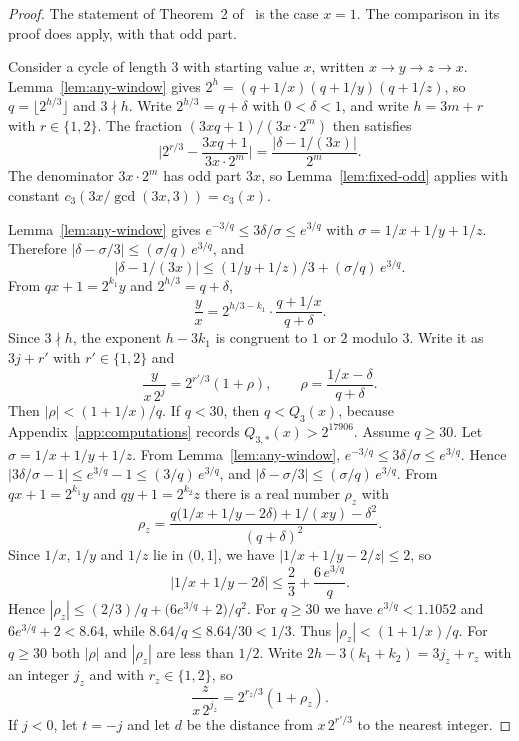 \documentclass[11pt]{article}
\begin{document}
\begin{proof}
The statement of Theorem~2 of~\cite{hackman-i} is the case $x = 1$.
The comparison in its proof does apply, with that odd part.

Consider a cycle of length $3$ with starting value $x$, written $x \to y \to z \to x$.
Lemma~\ref{lem:any-window} gives $2^h = (q+1/x)(q+1/y)(q+1/z)$, so $q = \lfloor 2^{h/3} \rfloor$ and $3 \nmid h$.
Write $2^{h/3} = q + \delta$ with $0 < \delta < 1$, and write $h = 3m + r$ with $r \in \{1, 2\}$.
The fraction $(3xq+1)/(3x \cdot 2^m)$ then satisfies
\[
\Biggl| 2^{r/3} - \frac{3xq+1}{3x \cdot 2^m} \Biggr| = \frac{|\delta - 1/(3x)|}{2^m}.
\]
The denominator $3x \cdot 2^m$ has odd part $3x$, so Lemma~\ref{lem:fixed-odd} applies with constant $c_3(3x/\gcd(3x, 3)) = c_3(x)$.

Lemma~\ref{lem:any-window} gives $e^{-3/q} \le 3\delta/\sigma \le e^{3/q}$ with $\sigma = 1/x + 1/y + 1/z$.
Therefore $|\delta - \sigma/3| \le (\sigma/q)\, e^{3/q}$, and
\[
\bigl|\delta - 1/(3x)\bigr| \le (1/y + 1/z)/3 + (\sigma/q)\, e^{3/q}.
\]
From $qx + 1 = 2^{k_1} y$ and $2^{h/3} = q+\delta$,
\[
\frac{y}{x} = 2^{h/3 - k_1} \cdot \frac{q + 1/x}{q+\delta}.
\]
Since $3 \nmid h$, the exponent $h - 3k_1$ is congruent to $1$ or $2$ modulo $3$.
Write it as $3j + r'$ with $r' \in \{1, 2\}$ and
\[
\frac{y}{x\, 2^{j}} = 2^{r'/3}(1+\rho), \qquad \rho = \frac{1/x - \delta}{q+\delta}.
\]
Then $|\rho| < (1+1/x)/q$.
If $q < 30$, then $q < Q_3(x)$, because Appendix~\ref{app:computations} records $Q_{3,*}(x) > 2^{17906}$.
Assume $q \ge 30$.
Let $\sigma = 1/x + 1/y + 1/z$.
From Lemma~\ref{lem:any-window}, $e^{-3/q} \le 3\delta/\sigma \le e^{3/q}$.
Hence $|3\delta/\sigma - 1| \le e^{3/q} - 1 \le (3/q)\, e^{3/q}$, and $|\delta - \sigma/3| \le (\sigma/q)\, e^{3/q}$.
From $qx + 1 = 2^{k_1} y$ and $qy + 1 = 2^{k_2} z$ there is a real number $\rho_z$ with
\[
\rho_z = \frac{q\bigl(1/x + 1/y - 2\delta\bigr) + 1/(xy) - \delta^2}{(q+\delta)^2}.
\]
Since $1/x$, $1/y$ and $1/z$ lie in $(0, 1]$, we have $|1/x + 1/y - 2/z| \le 2$, so
\[
\bigl|1/x + 1/y - 2\delta\bigr| \le \frac23 + \frac{6\, e^{3/q}}{q}.
\]
Hence $|\rho_z| \le (2/3)/q + \bigl(6e^{3/q} + 2\bigr)/q^2$.
For $q \ge 30$ we have $e^{3/q} < 1.1052$ and $6e^{3/q}+2 < 8.64$, while $8.64/q \le 8.64/30 < 1/3$.
Thus $|\rho_z| < (1+1/x)/q$.
For $q \ge 30$ both $|\rho|$ and $|\rho_z|$ are less than $1/2$.
Write $2h - 3(k_1 + k_2) = 3j_z + r_z$ with an integer $j_z$ and with $r_z \in \{1, 2\}$, so
\[
\frac{z}{x\, 2^{j_z}} = 2^{r_z/3}(1+\rho_z).
\]
If $j < 0$, let $t = -j$ and let $d$ be the distance from $x\, 2^{r'/3}$ to the nearest integer.

\end{proof}
\end{document}
